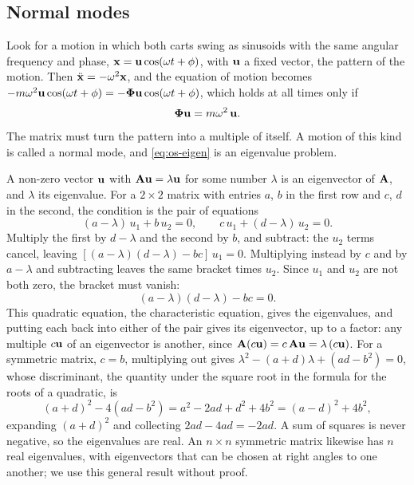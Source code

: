 \subsection*{Normal modes}

Look for a motion in which both carts swing as sinusoids with the same
angular frequency and phase, $\bm{\mathrm{x}} = \bm{\mathrm{u}}\cos(\omega t + \phi)$, with
$\bm{\mathrm{u}}$ a fixed vector, the pattern of the motion. Then $\ddot{\bm{\mathrm{x}}} =
-\omega^2\bm{\mathrm{x}}$, and the equation of motion becomes $-m\omega^2\bm{\mathrm{u}}
\cos(\omega t + \phi) = -\boldsymbol{\Phi}\bm{\mathrm{u}}\cos(\omega t + \phi)$, which holds
at all times only if
\begin{equation}
   \boldsymbol{\Phi}\bm{\mathrm{u}} = m\omega^2\,\bm{\mathrm{u}} .
   \label{eq:os-eigen}
\end{equation}
The matrix must turn the pattern into a multiple of itself. A motion of
this kind is called a normal mode, and \cref{eq:os-eigen} is an eigenvalue
problem.

\begin{toolbox}
A non-zero vector $\bm{\mathrm{u}}$ with $\bm{\mathrm{A}}\bm{\mathrm{u}} = \lambda\bm{\mathrm{u}}$ for some
number $\lambda$ is an eigenvector of $\bm{\mathrm{A}}$, and $\lambda$ its
eigenvalue. For a $2\times2$ matrix with entries $a$, $b$ in the first
row and $c$, $d$ in the second, the condition is the pair of equations
\begin{equation*}
   (a - \lambda)\,u_1 + b\,u_2 = 0 , \qquad
   c\,u_1 + (d - \lambda)\,u_2 = 0 .
\end{equation*}
Multiply the first by $d - \lambda$ and the second by $b$, and subtract:
the $u_2$ terms cancel, leaving $[(a - \lambda)(d - \lambda) - bc]\,u_1 =
0$. Multiplying instead by $c$ and by $a - \lambda$ and subtracting leaves
the same bracket times $u_2$. Since $u_1$ and $u_2$ are not both zero,
the bracket must vanish:
\begin{equation*}
   (a - \lambda)(d - \lambda) - bc = 0 .
\end{equation*}
This quadratic equation, the characteristic equation, gives the
eigenvalues, and putting each back into either of the pair gives its
eigenvector, up to a factor: any multiple $c\bm{\mathrm{u}}$ of an eigenvector is
another, since $\bm{\mathrm{A}}(c\bm{\mathrm{u}}) = c\,\bm{\mathrm{A}}\bm{\mathrm{u}} = \lambda\,(c\bm{\mathrm{u}})$.
For a symmetric matrix, $c = b$, multiplying out gives $\lambda^2 - (a +
d)\lambda + (ad - b^2) = 0$, whose discriminant, the quantity under the
square root in the formula for the roots of a quadratic, is
\begin{equation*}
   (a + d)^2 - 4(ad - b^2) = a^2 - 2ad + d^2 + 4b^2 = (a - d)^2 + 4b^2 ,
\end{equation*}
expanding $(a + d)^2$ and collecting $2ad - 4ad = -2ad$. A sum of squares
is never negative, so the eigenvalues are real. An $n\times
n$ symmetric matrix likewise has $n$ real eigenvalues, with eigenvectors
that can be chosen at right angles to one another; we use this general
result without proof.
\end{toolbox}

